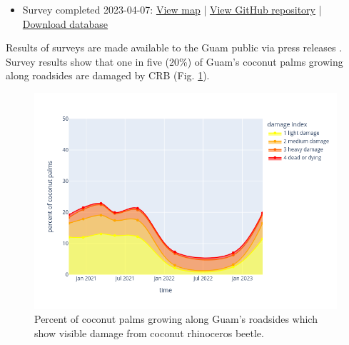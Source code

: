 \begin{refsection}
\begin{itemize}
\item Survey completed 2023-04-07:  
\href{https://aubreymoore.github.io/Guam-CRB-Damage-Map-2023-04/webmap/#11/13.4483/144.7860}{View map} | 
\href{https://github.com/aubreymoore/Guam-CRB-Damage-Map-2023-04}{View GitHub repository} | 
\href{https://github.com/aubreymoore/Guam-CRB-Damage-Map-2023-04/raw/main/output/results.db}{Download database}

\end{itemize}

Results of surveys are made available to the Guam public via press releases \cite{moorePressRelease2023}. Survey results show that one in five (20\%) of Guam's coconut palms growing along roadsides are damaged by CRB (Fig. \ref{fig:timeline}).

\begin{figure}[H]
	\centering
	\includegraphics[width=1\linewidth]{images/timeline}
	\caption{Percent of coconut palms growing along Guam's roadsides which show visible damage from coconut rhinoceros beetle.}
	\label{fig:timeline}
\end{figure}



%
%


\end{refsection}
